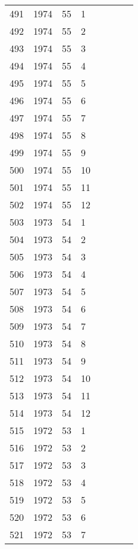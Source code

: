 \begin{longtable}{ |l|l|l|l|l|l|l|l| }
491 & 1974 & 55 &     1 &         &  &  & \\
492 & 1974 & 55 &     2 &         &  &  & \\
493 & 1974 & 55 &     3 &         &  &  & \\
494 & 1974 & 55 &     4 &         &  &  & \\
495 & 1974 & 55 &     5 &         &  &  & \\
496 & 1974 & 55 &     6 &         &  &  & \\
497 & 1974 & 55 &     7 &         &  &  & \\
498 & 1974 & 55 &     8 &         &  &  & \\
499 & 1974 & 55 &     9 &         &  &  & \\
500 & 1974 & 55 &    10 &         &  &  & \\
501 & 1974 & 55 &    11 &         &  &  & \\
502 & 1974 & 55 &    12 &         &  &  & \\
503 & 1973 & 54 &     1 &         &  &  & \\
504 & 1973 & 54 &     2 &         &  &  & \\
505 & 1973 & 54 &     3 &         &  &  & \\
506 & 1973 & 54 &     4 &         &  &  & \\
507 & 1973 & 54 &     5 &         &  &  & \\
508 & 1973 & 54 &     6 &         &  &  & \\
509 & 1973 & 54 &     7 &         &  &  & \\
510 & 1973 & 54 &     8 &         &  &  & \\
511 & 1973 & 54 &     9 &         &  &  & \\
512 & 1973 & 54 &    10 &         &  &  & \\
513 & 1973 & 54 &    11 &         &  &  & \\
514 & 1973 & 54 &    12 &         &  &  & \\
515 & 1972 & 53 &     1 &         &  &  & \\
516 & 1972 & 53 &     2 &         &  &  & \\
517 & 1972 & 53 &     3 &         &  &  & \\
518 & 1972 & 53 &     4 &         &  &  & \\
519 & 1972 & 53 &     5 &         &  &  & \\
520 & 1972 & 53 &     6 &         &  &  & \\
521 & 1972 & 53 &     7 &         &  &  & \\

\end{longtable}
